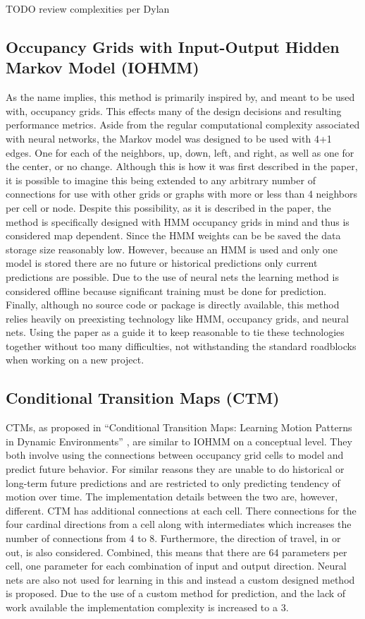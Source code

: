   TODO review complexities per Dylan

  \subsection { Occupancy Grids with Input-Output Hidden Markov Model (IOHMM) }
  As the name implies, this method is primarily inspired by, and meant to be
  used with, occupancy grids. This effects many of the design decisions and
  resulting performance metrics. Aside from the regular computational complexity
  associated with neural networks, the Markov model was designed to be
  used with 4+1 edges. One for each of the neighbors, up, down, left, and right,
  as well as one for the center, or no change. Although this is how it was first
  described in the paper, it is possible to imagine this being extended to any
  arbitrary number of connections for use with other grids or graphs with more
  or less than 4 neighbors per cell or node. Despite this possibility, as it is
  described in the paper, the method is specifically designed with HMM occupancy
  grids in mind and thus is considered map dependent. Since the HMM weights can be
  be saved the data storage size reasonably low. However, because an HMM is used
  and only one model is stored there are no future or historical predictions
  only current predictions are possible. Due to the use of neural nets
  the learning method is considered offline because significant training must be
  done for prediction. Finally, although no source code or package is directly
  available, this method relies heavily on preexisting technology like HMM,
  occupancy grids, and neural nets. Using the paper as a guide it to keep
  reasonable to tie these technologies together without too many difficulties,
  not withstanding the standard roadblocks when working on a new project.

  \subsection { Conditional Transition Maps (CTM) }
  CTMs, as proposed in ``Conditional Transition Maps: Learning Motion Patterns
  in Dynamic Environments'' \cite{Kucner2013}, are similar to IOHMM on a conceptual
  level. They both involve using the connections between occupancy grid cells
  to model and predict future behavior. For similar reasons they are unable to
  do historical or long-term future predictions and are restricted to only
  predicting tendency of motion over time. The implementation details between
  the two are, however, different. CTM has additional connections at each cell.
  There connections for the four cardinal directions from a cell
  along with intermediates which increases the number of connections
  from 4 to 8. Furthermore, the direction of travel, in or out, is also
  considered. Combined, this means that there are 64 parameters per cell, one
  parameter for each combination of input and output direction. Neural nets
  are also not used for learning in this and instead a custom designed
  method is proposed. Due to the use of a custom method for prediction, and
  the lack of work available the implementation complexity is increased to a 3.

